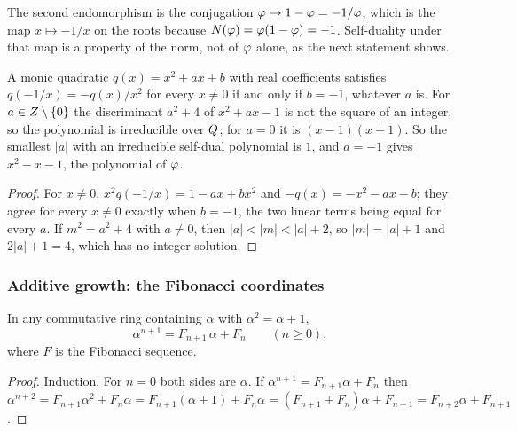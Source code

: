 The second endomorphism is the conjugation $\varphi\mapsto1-\varphi=-1/\varphi$, which is the map
$x\mapsto-1/x$ on the roots because $N(\varphi)=\varphi(1-\varphi)=-1$.  Self-duality under that map
is a property of the norm, not of $\varphi$ alone, as the next statement shows.

\begin{proposition}\label{prop:selfdual}
A monic quadratic $q(x)=x^2+ax+b$ with real coefficients satisfies $q(-1/x)=-q(x)/x^2$ for every
$x\ne0$ if and only if $b=-1$, whatever $a$ is.  For $a\in Z\setminus\{0\}$ the discriminant $a^2+4$ of
$x^2+ax-1$ is not the square of an integer, so the polynomial is irreducible over $Q$; for $a=0$ it is
$(x-1)(x+1)$.  So the smallest $|a|$ with an irreducible self-dual polynomial is $1$, and $a=-1$ gives
$x^2-x-1$, the polynomial of $\varphi$.
\end{proposition}
\begin{proof}
For $x\ne0$, $x^2q(-1/x)=1-ax+bx^2$ and $-q(x)=-x^2-ax-b$; they agree for every $x\ne0$ exactly when
$b=-1$, the two linear terms being equal for every $a$.  If $m^2=a^2+4$ with $a\ne0$, then
$|a|<|m|<|a|+2$, so $|m|=|a|+1$ and $2|a|+1=4$, which has no integer solution.
\end{proof}

\subsubsection{Additive growth: the Fibonacci coordinates}\label{ssec:fib-coords}

\begin{proposition}\label{prop:binet}
In any commutative ring containing $\alpha$ with $\alpha^2=\alpha+1$,
\begin{equation}\label{eq:binet-integral}
  \alpha^{n+1}=F_{n+1}\,\alpha+F_n\qquad(n\ge0),
\end{equation}
where $F$ is the Fibonacci sequence.
\end{proposition}
\begin{proof}
Induction.  For $n=0$ both sides are $\alpha$.  If
$\alpha^{n+1}=F_{n+1}\alpha+F_n$ then
$\alpha^{n+2}=F_{n+1}\alpha^2+F_n\alpha=F_{n+1}(\alpha+1)+F_n\alpha
=(F_{n+1}+F_n)\alpha+F_{n+1}=F_{n+2}\alpha+F_{n+1}$.
\end{proof}

